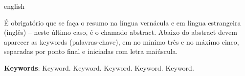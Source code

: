\begin{resumo}[Abstract]
	\begin{otherlanguage*}{english}
		
		É obrigatório que se faça o resumo na língua vernácula e em língua estrangeira (inglês) – neste último caso, é o chamado abstract. Abaixo do
		abstract devem aparecer as keywords (palavras-chave), em no mínimo três e no máximo cinco, separadas por ponto final e iniciadas com letra maiúscula.
				
		\vspace{\onelineskip}
		
		\noindent 
		\textbf{Keywords}: Keyword. Keyword. Keyword. Keyword. Keyword.
	\end{otherlanguage*}
\end{resumo}
